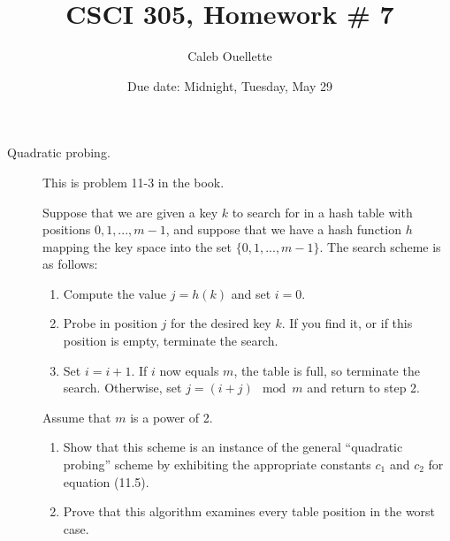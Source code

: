 \documentclass{article}
\title{CSCI 305, Homework \# 7}
\author{Caleb Ouellette}
\date{Due date:  Midnight, Tuesday, May 29}
\begin{document}
\maketitle

\begin{description}
\item[Quadratic probing.]  This is problem 11-3
  in the book.

  Suppose that we are given a key $k$ to search for in a hash table
  with positions $0,1,...,m-1$, and suppose that we have a hash
  function $h$ mapping the key space into the set $\{0,1,...,m-1\}$.
  The search scheme is as follows:

  \begin{enumerate}
  \item Compute the value $j=h(k)$ and set $i=0$.
    \item Probe in position $j$ for the desired key $k$.  If you find
      it, or if this position is empty, terminate the search.
      \item Set $i=i+1$.  If $i$ now equals $m$, the table is full, so
        terminate the search.  Otherwise, set $j=(i+j)\mod m$ and
        return to step 2.
  \end{enumerate}
  Assume that $m$ is a power of 2.
  \renewcommand{\theenumi}{\alph{enumi}}
  \begin{enumerate}
    \item Show that this scheme is an instance of the general
      ``quadratic probing'' scheme by exhibiting the appropriate
      constants $c_1$ and $c_2$ for equation (11.5).
      \item Prove that this algorithm examines every table position in
        the worst case.
  \end{enumerate}
  

\end{description}
\end{document}
